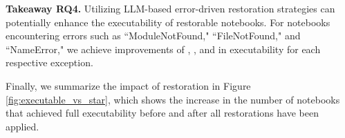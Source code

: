 
\begin{tcolorbox} [left=0mm, right=0mm, top=0mm, bottom=0mm]
    \textbf{Takeaway RQ4.} Utilizing LLM-based error-driven restoration strategies can potentially enhance the executability of restorable notebooks. For notebooks encountering errors such as ``ModuleNotFound," ``FileNotFound," and ``NameError," we achieve improvements of \averagePercentModuleNotFoundRestoredIncrease, \avgIncreaseAfterFileFixed, and \avgIncreaseAfterNameFixed in executability for each respective exception.
\end{tcolorbox}

\noindent Finally, we summarize the impact of restoration in Figure \ref{fig:executable_vs_star}, which shows the increase in the number of notebooks that achieved full executability before and after all restorations have been applied. 














